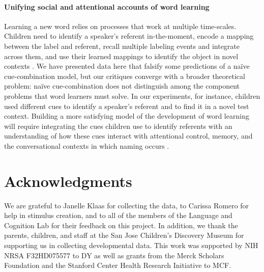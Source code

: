 \documentclass[man,floatsintext]{apa6}
\begin{document}
\paragraph{Unifying social and attentional accounts of word learning}

Learning a new word relies on processes that work at multiple time-scales. Children need to identify a speaker's referent in-the-moment, encode a mapping between the label and referent, recall multiple labeling events and integrate across them, and use their learned mappings to identify the object in novel contexts \cite{Frank2009a,McMurray2012, Yu2012b}. We have presented data here that falsify some predictions of a na\"ive cue-combination model, but our critiques converge with a broader theoretical problem: na\"{i}ve cue-combination does not distinguish among the component problems that word learners must solve. In our experiments, for instance, children used different cues to identify a speaker's referent and to find it in a novel test context. Building a more satisfying model of the development of word learning will require integrating the cues children use to identify referents with an understanding of how these cues interact with attentional control, memory, and the conversational contexts in which naming occurs \cite{Frank2013a, Yurovsky2013c}.

\section{Acknowledgments}

We are grateful to Janelle Klaas for collecting the data, to Carissa Romero for help in stimulus creation, and to all of the members of the Language and Cognition Lab for their feedback on this project. In addition, we thank the parents, children, and staff at the San Jose Children's Discovery Museum for supporting us in collecting developmental data. This work was supported by NIH NRSA F32HD075577 to DY as well as grants from the Merck Scholars Foundation and the Stanford Center Health Research Initiative to MCF.



\end{document}
